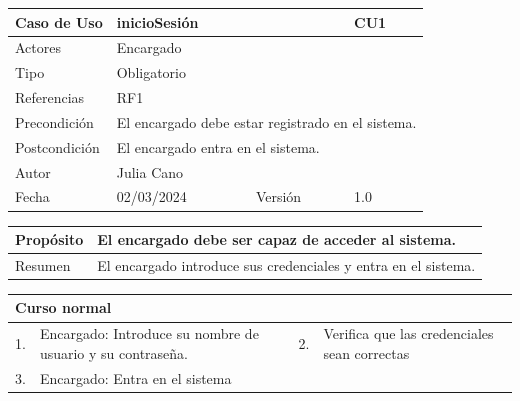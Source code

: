 
\begin{table}[H]
	\centering
	\begin{tabular}{| m{} | m{} | m{} | m{} |}
		\hline
		\rowcolor{grayshade} Caso de Uso & \multicolumn{2}{|m{0.43\textwidth}|}{inicioSesión} &  CU1\\ 
		\hline
		Actores & \multicolumn{3}{l|}{Encargado} \\ 
		\hline
		Tipo & \multicolumn{3}{l|}{Obligatorio} \\ 
		\hline
		Referencias & \multicolumn{3}{l|}{RF1} \\ 
		\hline
		Precondición & \multicolumn{3}{l|}{El encargado debe estar registrado en el sistema.} \\ 
		\hline
		Postcondición & \multicolumn{3}{l|}{El encargado entra en el sistema.} \\ 
		\hline
		Autor & \multicolumn{3}{l|}{Julia Cano} \\ 
		\hline
		Fecha & 02/03/2024 & Versión & 1.0 \\
		\hline
	\end{tabular}
\end{table}

\begin{table}[H]
	\centering
	\begin{tabular}{| m{} | m{} | m{} | m{} |}
		\hline
		Propósito & \multicolumn{3}{m{0.67\textwidth}|}{El encargado debe ser capaz de acceder al sistema.}   \\ 
		\hline
		Resumen & \multicolumn{3}{m{0.67\textwidth}|}{El encargado introduce sus credenciales y entra en el sistema.} \\ 
		\hline
	\end{tabular}
\end{table}

\begin{table}[H]
	\centering
	\begin{tabular}{| m{} | m{} | m{} | m{} |}
		\hline
		\multicolumn{4}{|m{0.9\textwidth}|}{Curso normal}     \\ 
		\hline
		1. & Encargado: Introduce su nombre de usuario y su contraseña. & 2. &  Verifica que las credenciales sean correctas \\ 
		\hline
		3. & Encargado: Entra en el sistema & &  \\ 
		\hline
	\end{tabular}
\end{table}

